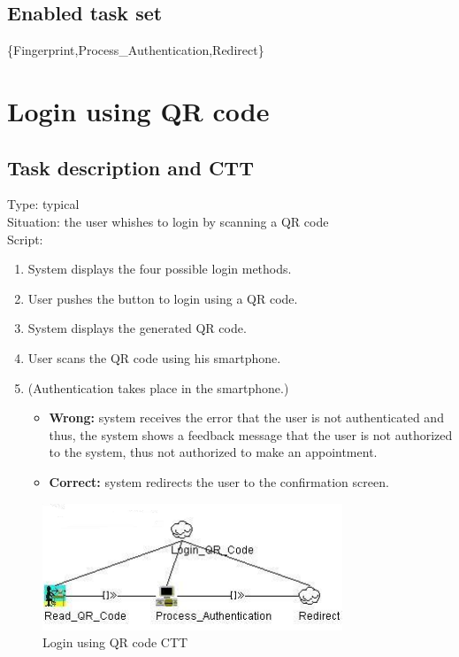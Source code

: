 \documentclass[11pt, a4paper,svglistings]{report}
\begin{document}
\subsection{Enabled task set}

\{Fingerprint,Process\_Authentication,Redirect\}


\newpage

\section{\label{subsec:loginNFC}Login using QR code}

\subsection{Task description and CTT}

Type: typical \\
Situation: the user whishes to login by scanning a QR code \\
Script:
\begin{enumerate}
\item System displays the four possible login methods.
\item User pushes the button to login using a QR code.
\item System displays the generated QR code.
\item User scans the QR code using his smartphone.
\item (Authentication takes place in the smartphone.)
\begin{itemize}
\item \textbf{Wrong:} system receives the error that the user is not authenticated and thus, the system shows a feedback message that the user is not authorized to the system, thus not authorized to make an appointment.
\item \textbf{Correct:} system redirects the user to the confirmation screen.
\end{itemize}
\end{enumerate}

\begin{figure}[H]
\centering
    \includegraphics[width=0.8\textwidth]{LoginQR.png}
  \caption[QR CTT]{\label{fig:Logout}Login using QR code CTT}
\end{figure}
\end{document}
